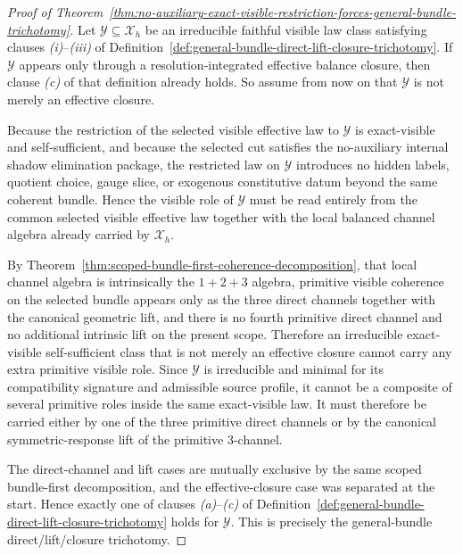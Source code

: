 \begin{proof}[Proof of Theorem~\ref{thm:no-auxiliary-exact-visible-restriction-forces-general-bundle-trichotomy}]
\label{proof:thm:no-auxiliary-exact-visible-restriction-forces-general-bundle-trichotomy}
Let \(\mathcal Y\subseteq \mathcal X_h\) be an irreducible faithful visible law
class satisfying clauses \emph{(i)}--\emph{(iii)} of
Definition~\ref{def:general-bundle-direct-lift-closure-trichotomy}. If
\(\mathcal Y\) appears only through a resolution-integrated effective balance
closure, then clause \emph{(c)} of that definition already holds. So assume
from now on that \(\mathcal Y\) is not merely an effective closure.

Because the restriction of the selected visible effective law to \(\mathcal Y\)
is exact-visible and self-sufficient, and because the selected cut satisfies
the no-auxiliary internal shadow elimination package, the restricted law on
\(\mathcal Y\) introduces no hidden labels, quotient choice, gauge slice, or
exogenous constitutive datum beyond the same coherent bundle. Hence the visible
role of \(\mathcal Y\) must be read entirely from the common selected visible
effective law together with the local balanced channel algebra already carried
by \(\mathcal X_h\).

By Theorem~\ref{thm:scoped-bundle-first-coherence-decomposition}, that local
channel algebra is intrinsically the \(1+2+3\) algebra, primitive visible
coherence on the selected bundle appears only as the three direct channels
together with the canonical geometric lift, and there is no fourth primitive
direct channel and no additional intrinsic lift on the present scope.
Therefore an irreducible exact-visible self-sufficient class that is not merely
an effective closure cannot carry any extra primitive visible role. Since
\(\mathcal Y\) is irreducible and minimal for its compatibility signature and
admissible source profile, it cannot be a composite of several primitive roles
inside the same exact-visible law. It must therefore be carried either by one
of the three primitive direct channels or by the canonical symmetric-response
lift of the primitive \(3\)-channel.

The direct-channel and lift cases are mutually exclusive by the same scoped
bundle-first decomposition, and the effective-closure case was separated at the
start. Hence exactly one of clauses \emph{(a)}--\emph{(c)} of
Definition~\ref{def:general-bundle-direct-lift-closure-trichotomy} holds for
\(\mathcal Y\). This is precisely the general-bundle direct/lift/closure
trichotomy.
\end{proof}


